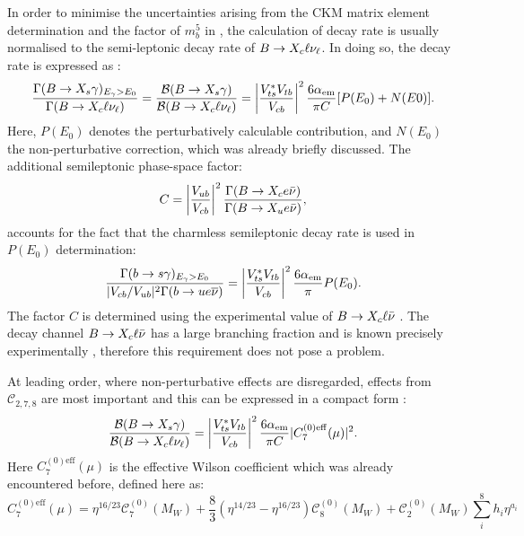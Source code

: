 In order to minimise the uncertainties arising from the CKM matrix element determination and the factor of $m_b^5$ in , the calculation of \BtoXsgamma decay rate is usually normalised to the semi-leptonic decay rate of $B\rightarrow X_c\ell\nu_{\ell}$.
In doing so, the decay rate is expressed as \cite{Misiak:2020vlo}:
\begin{equation}\label{eq:normalised_br}
    \frac{\Gamma({B\rightarrow X_{s} \gamma})_{{E_{\gamma}}>E_0}}{\Gamma(B\rightarrow X_c\ell\nu_\ell)} = \frac{\mathcal{B}({B\rightarrow X_{s} \gamma})}{\mathcal{B}(B\rightarrow X_c\ell\nu_\ell)} = \left|\frac{V_{ts}^*V_{tb}}{V_{cb}}\right|^2\frac{6\alpha_{\mathrm{em}}}{\pi C}[P(E_0)+N(E0)].
\end{equation}
Here, $P(E_0)$ denotes the perturbatively calculable contribution, and $N(E_0)$ the non-perturbative correction, which was already briefly discussed.
The additional semileptonic phase-space factor:
\begin{equation}
    C = \left|\frac{V_{ub}}{V_{cb}}\right|^2 \frac{\Gamma(B\rightarrow X_ce\bar{\nu})}{\Gamma(B\rightarrow X_ue\bar{\nu})},
\end{equation}  
accounts for the fact that the charmless semileptonic decay rate is used in $P(E_0)$ determination:
\begin{equation}
    \frac{\Gamma(b\rightarrow s\gamma)_{{E_{\gamma}}>E_0}}{|V_{cb}/V_{ub}|^2 \Gamma(b\rightarrow u e\overline{\nu})} = \left|\frac{V_{ts}^*V_{tb}}{V_{cb}}\right|^2 \frac{6\alpha_{\mathrm{em}}}{\pi}P(E_0).
\end{equation}
The factor $C$ is determined using the experimental value of $B\rightarrow X_c \ell\bar{\nu}$ \cite{Alberti:2014yda}.
The decay channel $B\rightarrow X_c \ell\bar{\nu}$ has a large branching fraction and is known precisely experimentally \cite{Workman:2022ynf}, therefore this requirement does not pose a problem.

At leading order, where non-perturbative effects are disregarded, effects from $\mathcal{C}_{2,7,8}$ are most important and this can be expressed in a compact form \cite{Buras:1993xp}:
\begin{equation}
    \frac{\mathcal{B}({B\rightarrow X_{s} \gamma})}{\mathcal{B}(B\rightarrow X_c\ell\nu_\ell)} = \left|\frac{V_{ts}^*V_{tb}}{V_{cb}}\right|^2\frac{6\alpha_{\mathrm{em}}}{\pi C}|C_{7}^{(0)\mathrm{eff}}(\mu)|^2.
\end{equation}
Here $C_{7}^{(0)\mathrm{eff}}(\mu)$ is the effective Wilson coefficient which was already encountered before, defined here as:
\begin{equation}
    C_{7}^{(0)\mathrm{eff}}(\mu) = \eta^{16/23}\mathcal{C}^{(0)}_7(M_W) + \frac{8}{3} \left(\eta^{14/23}-\eta^{16/23}\right)\mathcal{C}^{(0)}_8(M_W) + \mathcal{C}^{(0)}_2(M_W) \sum_i^8h_i\eta^{a_i}
\end{equation}

